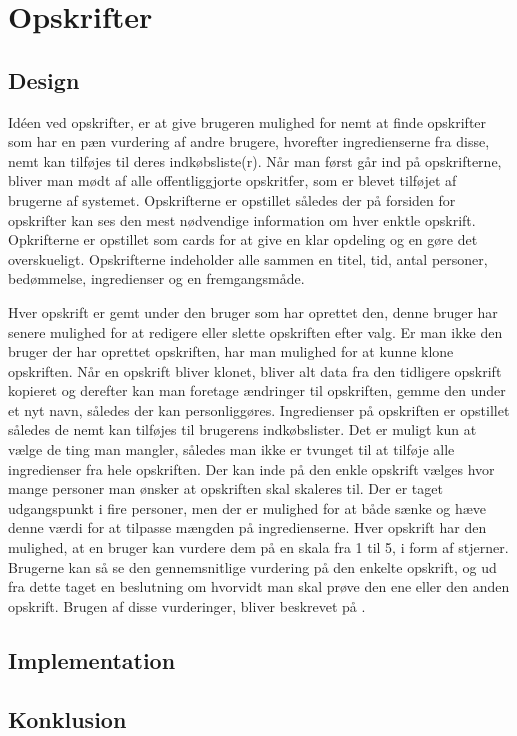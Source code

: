 \section{Opskrifter}
\subsection{Design}
Idéen ved opskrifter, er at give brugeren mulighed for nemt at finde opskrifter som har en pæn vurdering af andre brugere, hvorefter ingredienserne fra disse, nemt kan tilføjes til deres indkøbsliste(r).
Når man først går ind på opskrifterne, bliver man mødt af alle offentliggjorte opskritfer, som er blevet tilføjet af brugerne af systemet.
Opskrifterne er opstillet således der på forsiden for opskrifter kan ses den mest nødvendige information om hver enktle opskrift.
Opkrifterne er opstillet som cards for at give en klar opdeling og en gøre det overskueligt.
Opskrifterne indeholder alle sammen en titel, tid, antal personer, bedømmelse, ingredienser og en fremgangsmåde.


Hver opskrift er gemt under den bruger som har oprettet den, denne bruger har senere mulighed for at redigere eller slette opskriften efter valg.
Er man ikke den bruger der har oprettet opskriften, har man mulighed for at kunne klone opskriften.
Når en opskrift bliver klonet, bliver alt data fra den tidligere opskrift kopieret og derefter kan man foretage ændringer til opskriften, gemme den under et nyt navn, således der kan personliggøres.
Ingredienser på opskriften er opstillet således de nemt kan tilføjes til brugerens indkøbslister.
Det er muligt kun at vælge de ting man mangler, således man ikke er tvunget til at tilføje alle ingredienser fra hele opskriften.
Der kan inde på den enkle opskrift vælges hvor mange personer man ønsker at opskriften skal skaleres til.
Der er taget udgangspunkt i fire personer, men der er mulighed for at både sænke og hæve denne værdi for at tilpasse mængden på ingredienserne.
Hver opskrift har den mulighed, at en bruger kan vurdere dem på en skala fra 1 til 5, i form af stjerner.
Brugerne kan så se den gennemsnitlige vurdering på den enkelte opskrift, og ud fra dette taget en beslutning om hvorvidt man skal prøve den ene eller den anden opskrift.
Brugen af disse vurderinger, bliver beskrevet på .
\iffalse
Opskrifter der er blevet vurderet højst kommer da til at ligge i toppen af listen af opskrifter, således dårlige eller useriøse opskrifter bliver sorteret til bunden.
\fi

\subsection{Implementation}
\subsection{Konklusion}


